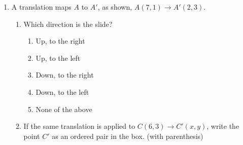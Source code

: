 \begin{enumerate}
\item A translation maps $A$ to $A'$, as shown, $A(7,1) \rightarrow A'(2,3)$.
\begin{multicols}{2}
  \begin{enumerate}
    \item Which direction is the slide?
    \begin{enumerate}[label=(\Alph*)]
      \item Up, to the right
      \item Up, to the left
      \item Down, to the right
      \item Down, to the left
      \item None of the above
    \end{enumerate} \vspace{2cm}
    \item If the same translation is applied to $C(6,3)\rightarrow C'(x,y)$, write the point $C'$ as an ordered pair in the box. (with parenthesis)
    \end{enumerate}
    \begin{flushright}
    \end{flushright}
  \end{multicols}
  

\end{enumerate}
